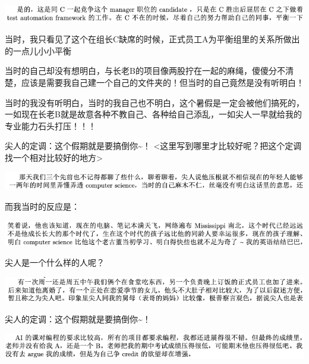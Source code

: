 \documentclass[9pt, b5paper]{article}
\begin{document}
\begin{center}
\includegraphics[width=.9\linewidth]{./pic/backups_plans_20210507_094251.png}
\end{center}

当时，我只看见了这个在组长C缺席的时候，正式员工A为平衡组里的关系所做出的一点儿小小平衡

当时的自己却没有想明白，与长老B的项目像两股拧在一起的麻绳，傻傻分不清楚，应该是需要我自己建一个自己的文件夹的！但当时的自己竟然是没有听明白！

当时的我没有听明白，当时的我自己也不明白，这个暑假是一定会被他们搞死的，一如现在长老B就是故意各种不教自己、各种给自己添乱，一如尖人一早就给我的专业能力石头打压！！！

尖人的定调：这个假期就是要搞倒你\textasciitilde{}！ <这里写到哪里才比较好呢？把这个定调找一个相对比较好的地方>

\begin{center}
\includegraphics[width=.9\linewidth]{./pic/backups_plans_20210507_091356.png}
\end{center}

而我当时的反应是： 

\begin{center}
\includegraphics[width=.9\linewidth]{./pic/backups_plans_20210507_091418.png}
\end{center}

尖人是一个什么样的人呢？

\begin{center}
\includegraphics[width=.9\linewidth]{./pic/backups_plans_20210507_103838.png}
\end{center}

尖人的定调：这个假期就是要搞倒你\textasciitilde{}！

\begin{center}
\includegraphics[width=.9\linewidth]{./pic/backups_plans_20210424_215822.png}
\end{center}
\end{document}
